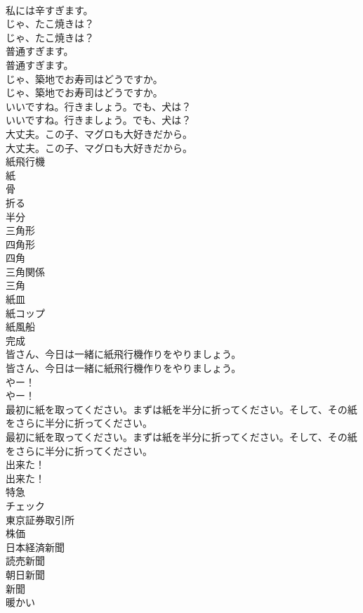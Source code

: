 \documentclass[8pt]{extreport}
\begin{document}
\begin{CJK}{UTF8}{min}
\\	私には辛すぎます。 
\\	じゃ、たこ焼きは？	
\\	じゃ、たこ焼きは？ 
\\	普通すぎます。	
\\	普通すぎます。 
\\	じゃ、築地でお寿司はどうですか。	
\\	じゃ、築地でお寿司はどうですか。 
\\	いいですね。行きましょう。でも、犬は？	
\\	いいですね。行きましょう。でも、犬は？ 
\\	大丈夫。この子、マグロも大好きだから。	
\\	大丈夫。この子、マグロも大好きだから。 
\\	紙飛行機
\\	紙
\\	骨
\\	折る
\\	半分
\\	三角形
\\	四角形
\\	四角
\\	三角関係
\\	三角
\\	紙皿
\\	紙コップ
\\	紙風船
\\	完成
\\	皆さん、今日は一緒に紙飛行機作りをやりましょう。	
\\	皆さん、今日は一緒に紙飛行機作りをやりましょう。 
\\	やー！	
\\	やー！ 
\\	最初に紙を取ってください。まずは紙を半分に折ってください。そして、その紙をさらに半分に折ってください。	
\\	最初に紙を取ってください。まずは紙を半分に折ってください。そして、その紙をさらに半分に折ってください。 
\\	出来た！	
\\	出来た！ 
\\	特急
\\	チェック
\\	東京証券取引所
\\	株価
\\	日本経済新聞
\\	読売新聞
\\	朝日新聞
\\	新聞
\\	暖かい

\end{CJK}
\end{document}
